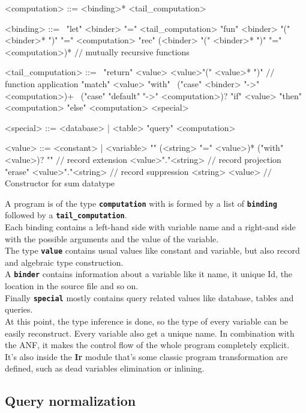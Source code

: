 \documentclass[11pt]{article}
\newcommand\sig[1]{{\tt\bf #1}}
\newcommand\module[1]{{\bf #1}}
\renewcommand\comment[1]{{\color{gray} $//$ #1}}
\begin{document}
\begin{grammar}
<computation> ::= <binding>* <tail_computation>

<binding> ::= \
\alt "let" <binder> "=" <tail_computation>
\alt "fun" <binder> "(" <binder>* ")" "=" <computation>
\alt "rec" (<binder> "(" <binder>* ")" "=" <computation>)* \comment{mutually recursive functions}

<tail_computation> ::= \ 
\alt "return" <value>
\alt <value>"(" <value>* ")" \comment{function application}
\alt "match" <value> "with" \ 
  ("case" <binder> "->" <computation>)+ \ 
  ("case" "default" "->" <computation>)?
\alt "if" <value> "then" <computation> "else" <computation>
\alt <special>

<special> ::= <database> | <table>
\alt "query" <computation>

<value> ::= <constant> | <variable>
\alt "{" (<string> "=" <value>)* ("with" <value>)? "}" \comment{record extension}
\alt <value>"."<string> \comment{record projection}
\alt "erase" <value>"."<string> \comment{record suppression}
\alt <string> <value> \comment{Constructor for sum datatype}
\end{grammar}


A program is of the type \sig{computation} with is formed by a list of \sig{binding} followed by a \sig{tail\_computation}.\\
Each binding contains a left-hand side with variable name and a right-and side with the possible arguments and the value of the variable. \\
The type \sig{value} contains usual values like constant and variable, but also record and algebraic type construction.\\
A \sig{binder} contains information about a variable like it name, it unique Id, the location in the source file and so on.\\
Finally \sig{special} mostly contains query related values like database, tables and queries.\\

At this point, the type inference is done, so the type of every variable can be easily reconstruct. Every variable also get a unique name. In combination with the ANF, it makes the control flow of the whole program completely explicit.\\

It's also inside the \module{Ir} module that's some classic program transformation are defined, such as dead variables elimination or inlining.

\subsection{Query normalization \label{querynorm}}
\end{document}
